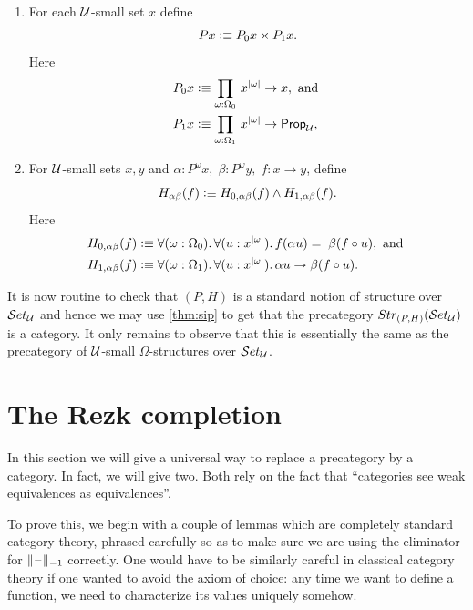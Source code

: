 \begin{defn}\label{defn:fo-notion-of-structure}
\mbox{}
\begin{enumerate}
\item For each $\mathcal{U}$-small set $x$ define
  \[ Px \vcentcolon\equiv P_0x\times P_1x.\]
  Here
  \begin{align*}
    P_0x &\defeq \prd{\omega:\Omega_0} x^{|\omega|}\to x, \mbox{ and } \\
    P_1x &\defeq \prd{\omega:\Omega_1} x^{|\omega|}\to \propU,
  \end{align*}
\item For $\mathcal{U}$-small sets $x,y$ and
  $\alpha:P^\omega x,\;\beta:P^\omega y,\; f:x\to y$, define
  \[ H_{\alpha\beta}(f) \vcentcolon\equiv H_{0,\alpha\beta}(f)\wedge H_{1,\alpha\beta}(f).\]
  Here
  \begin{align*}
    H_{0,\alpha\beta}(f) &\defeq
    \fall{\omega:\Omega_0}{u:x^{|\omega|}} f(\alpha u)=\;\beta(f\circ u),
    \mbox{ and }\\
    H_{1,\alpha\beta}(f) &\defeq
    \fall{\omega:\Omega_1}{u:x^{|\omega|}} \alpha u\to\beta(f\circ u).
  \end{align*}
\end{enumerate}
\end{defn}

It is now routine to check that $(P,H)$ is a standard notion of structure over $\mathcal{S}et_\mathcal{U}$ and hence we may use \cref{thm:sip} to get that the precategory $Str_{(P,H)}(\mathcal{S}et_\mathcal{U})$ is a category.  It only remains to observe that this is essentially the same as the precategory of $\mathcal{U}$-small $\Omega$-structures over $\mathcal{S}et_\mathcal{U}$.


\section{The Rezk completion}
\label{sec:rezk}

In this section we will give a universal way to replace a precategory by a category.
In fact, we will give two.
Both rely on the fact that ``categories see weak equivalences as equivalences''.

To prove this, we begin with a couple of lemmas which are completely standard category theory, phrased carefully so as to make sure we are using the eliminator for $\Vert \mathord{\hspace{1pt}\text{--}\hspace{1pt}} \Vert_{-1}$ correctly.
One would have to be similarly careful in classical category theory if one wanted to avoid the axiom of choice: any time we want to define a function, we need to characterize its values uniquely somehow.

